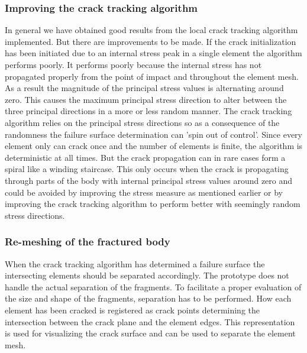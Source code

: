 \subsubsection*{Improving the crack tracking algorithm}
In general we have obtained good results from the local crack
tracking algorithm implemented. But there are improvements to be
made. If the crack initialization has been initiated due to an
internal stress peak in a single element the algorithm performs
poorly.
%
It performs poorly because the internal stress has not propagated
properly from the point of impact and throughout the element mesh.
As a result the magnitude of the principal stress values is
alternating around zero. This causes the maximum principal stress
direction to alter between the three principal directions in a more or
less random manner.
%
The crack tracking algorithm relies on the principal stress directions
so as a consequence of the randomness the failure surface
determination can 'spin out of control'. Since every element only can
crack once and the number of elements is finite, the algorithm is
deterministic at all times. But the crack propagation can in rare
cases form a spiral like a winding staircase. This only occurs when
the crack is propagating through parts of the body with internal
principal stress values around zero and could be avoided by improving
the stress measure as mentioned earlier or by improving the crack
tracking algorithm to perform better with seemingly random stress
directions.

\subsubsection*{Re-meshing of the fractured body}
When the crack tracking algorithm has determined a failure surface the
intersecting elements should be separated accordingly. The prototype
does not handle the actual separation of the fragments. To facilitate a
proper evaluation of the size and shape of the fragments, separation
has to be performed. How each element has been cracked is registered
as crack points determining the intersection between the crack plane
and the element edges. This representation is used for visualizing
the crack surface and can be used to separate the element mesh.

